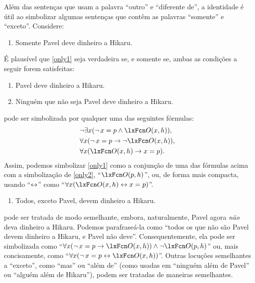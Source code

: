 Além das sentenças que usam a palavra \textquotedblleft outro\textquotedblright{} e \textquotedblleft diferente de\textquotedblright{}, a identidade é útil ao simbolizar algumas sentenças que contêm as palavras \textquotedblleft somente\textquotedblright{} e \textquotedblleft exceto\textquotedblright{}. Considere:
\begin{enumerate}
\item\label{only1} Somente Pavel deve dinheiro a Hikaru.
\end{enumerate}
É plausível que \cref*{only1} seja verdadeira se, e somente se, ambas as condições a seguir forem satisfeitas:
\begin{enumerate}
\item\label{only2} Pavel deve dinheiro a Hikaru.
\item\label{else3} Ninguém que não seja Pavel deve dinheiro a Hikaru.
\end{enumerate}
 pode ser simbolizada por qualquer uma das seguintes fórmulas:
\begin{align*}
	& \enot\exists x(\enot\, {x = p} \eand \atom{O}{x,h}),\\
	& \forall x(\enot\, {x = p} \eif \enot\atom{O}{x,h}),\\
	& \forall x(\atom{O}{x,h} \eif x = p).
\end{align*}
Assim, podemos simbolizar \cref*{only1} como a conjunção de uma das fórmulas acima com a simbolização de \cref*{only2}, \textquotedblleft $\atom{O}{p,h}$\textquotedblright{}, ou, de forma mais compacta, usando \textquotedblleft $\leftrightarrow$\textquotedblright{} como \textquotedblleft $\forall x(\atom{O}{x,h} \eiff x = p)$\textquotedblright{}.

\begin{enumerate}
\item\label{except} Todos, exceto Pavel, devem dinheiro a Hikaru.
	\end{enumerate}
 pode ser tratada de modo semelhante, embora, naturalmente, Pavel agora \emph{não} deva dinheiro a Hikaru. Podemos parafraseá-la como \textquotedblleft todos os que não são Pavel devem dinheiro a Hikaru, e Pavel não deve\textquotedblright{}. Consequentemente, ela pode ser simbolizada como \textquotedblleft $\forall x(\enot\, {x = p} \eif \atom{O}{x,h}) \eand \enot \atom{O}{p,h}$\textquotedblright{} ou, mais concisamente, como \textquotedblleft $\forall x(\enot\, {x = p} \eiff \atom{O}{x,h})$\textquotedblright{}. Outras locuções semelhantes a \textquotedblleft exceto\textquotedblright{}, como \textquotedblleft mas\textquotedblright{} ou \textquotedblleft além de\textquotedblright{} (como usadas em \textquotedblleft ninguém além de Pavel\textquotedblright{} ou \textquotedblleft alguém além de Hikaru\textquotedblright{}), podem ser tratadas de maneiras semelhantes.

